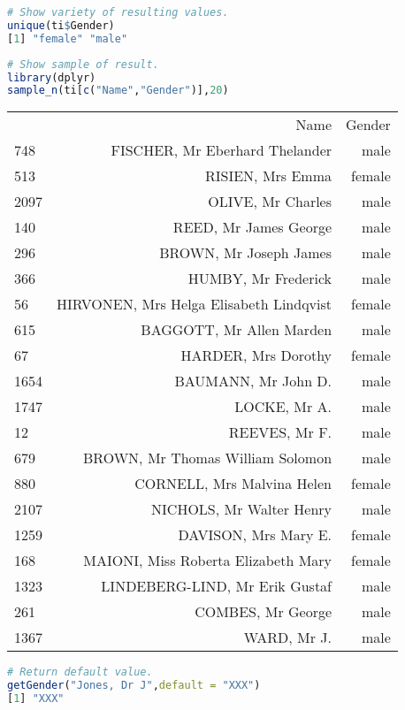 \documentclass[a4paper, 11pt]{article}
\begin{document}
\begin{lstlisting}[language=R,showstringspaces=false]
# Show variety of resulting values.
unique(ti$Gender)
[1] "female" "male"
\end{lstlisting} 

\begin{lstlisting}[language=R,showstringspaces=false]
# Show sample of result.
library(dplyr)
sample_n(ti[c("Name","Gender")],20)
\end{lstlisting}

\begin{tabular}{lrr}
  & Name & Gender \\
748 & FISCHER, Mr Eberhard Thelander & male \\
513 & RISIEN, Mrs Emma & female \\
2097 & OLIVE, Mr Charles & male \\
140 & REED, Mr James George & male \\
296 & BROWN, Mr Joseph James & male \\
366 & HUMBY, Mr Frederick & male \\
56 & HIRVONEN, Mrs Helga Elisabeth Lindqvist & female \\
615 & BAGGOTT, Mr Allen Marden & male \\
67 & HARDER, Mrs Dorothy & female \\
1654 & BAUMANN, Mr John D. & male \\
1747 & LOCKE, Mr A. & male \\
12 & REEVES, Mr F. & male \\
679 & BROWN, Mr Thomas William Solomon & male \\
880 & CORNELL, Mrs Malvina Helen & female \\
2107 & NICHOLS, Mr Walter Henry & male \\
1259 & DAVISON, Mrs Mary E. & female \\
168 & MAIONI, Miss Roberta Elizabeth Mary & female \\
1323 & LINDEBERG-LIND, Mr Erik Gustaf & male \\
261 & COMBES, Mr George & male \\
1367 & WARD, Mr J. & male \\
\end{tabular}

\begin{lstlisting}[language=R,showstringspaces=false]
# Return default value.
getGender("Jones, Dr J",default = "XXX")
[1] "XXX"
\end{lstlisting}
\end{document}
